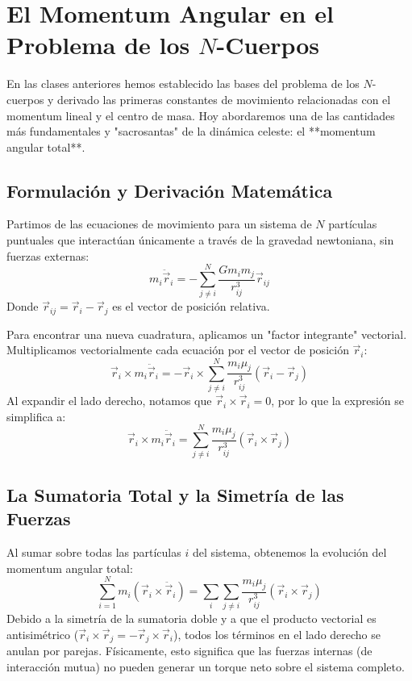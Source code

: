 \documentclass[a4paper]{article}
\begin{document}
\section{El Momentum Angular en el Problema de los $N$-Cuerpos}

En las clases anteriores hemos establecido las bases del problema de los $N$-cuerpos y derivado las primeras constantes de movimiento relacionadas con el momentum lineal y el centro de masa. Hoy abordaremos una de las cantidades más fundamentales y "sacrosantas" de la dinámica celeste: el **momentum angular total**.

\subsection{Formulación y Derivación Matemática}

Partimos de las ecuaciones de movimiento para un sistema de $N$ partículas puntuales que interactúan únicamente a través de la gravedad newtoniana, sin fuerzas externas:
\begin{equation}
    m_i \ddot{\vec{r}}_i = -\sum_{j \neq i}^{N} \frac{G m_i m_j}{r_{ij}^3} \vec{r}_{ij}
\end{equation}
Donde $\vec{r}_{ij} = \vec{r}_i - \vec{r}_j$ es el vector de posición relativa. 

Para encontrar una nueva cuadratura, aplicamos un "factor integrante" vectorial. Multiplicamos vectorialmente cada ecuación por el vector de posición $\vec{r}_i$:
\begin{equation}
    \vec{r}_i \times m_i \ddot{\vec{r}}_i = -\vec{r}_i \times \sum_{j \neq i}^{N} \frac{m_i \mu_j}{r_{ij}^3} (\vec{r}_i - \vec{r}_j)
\end{equation}
Al expandir el lado derecho, notamos que $\vec{r}_i \times \vec{r}_i = 0$, por lo que la expresión se simplifica a:
\begin{equation}
    \vec{r}_i \times m_i \ddot{\vec{r}}_i = \sum_{j \neq i}^{N} \frac{m_i \mu_j}{r_{ij}^3} (\vec{r}_i \times \vec{r}_j)
\end{equation}

\subsection{La Sumatoria Total y la Simetría de las Fuerzas}

Al sumar sobre todas las partículas $i$ del sistema, obtenemos la evolución del momentum angular total:
\begin{equation}
    \sum_{i=1}^N m_i (\vec{r}_i \times \ddot{\vec{r}}_i) = \sum_{i} \sum_{j \neq i} \frac{m_i \mu_j}{r_{ij}^3} (\vec{r}_i \times \vec{r}_j)
\end{equation}
Debido a la simetría de la sumatoria doble y a que el producto vectorial es antisimétrico ($\vec{r}_i \times \vec{r}_j = -\vec{r}_j \times \vec{r}_i$), todos los términos en el lado derecho se anulan por parejas. Físicamente, esto significa que las fuerzas internas (de interacción mutua) no pueden generar un torque neto sobre el sistema completo.
\end{document}
